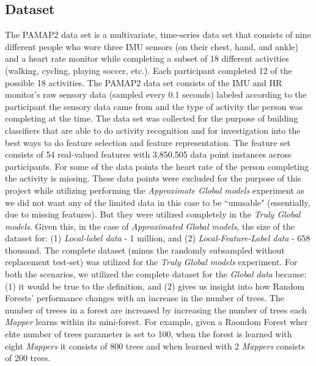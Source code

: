 \documentclass{sig-alternate-05-2015}
\begin{document}
\subsection{Dataset}
The PAMAP2 data set is a multivariate, time-series data set that consists of nine different people who wore three IMU sensors (on their chest, hand, and ankle) and a heart rate monitor while completing a subset of 18 different activities (walking, cycling, playing soccer, etc.). Each participant completed 12 of the possible 18 activities. The PAMAP2 data set consists of the IMU and HR monitor's raw sensory data (sampled every 0.1 seconds) labeled according to the participant the sensory data came from and the type of activity the person was completing at the time. The data set was collected for the purpose of building classifiers that are able to do activity recognition and for investigation into the best ways to do feature selection and feature representation. The feature set consists of 54 real-valued features with 3,850,505 data point instances across participants. For some of the data points the heart rate of the person completing the activity is missing. These data points were excluded for the purpose of this project while utilizing performing the \textit{Approximate Global models} experiment as we did not want any of the limited data in this case to be ``unusable" (essentially, due to missing features). But they were utilized completely in the \textit{Truly Global models}. Given this, in the case of \textit{Approximated Global models}, the size of the dataset for: (1) \textit{Local-label data} - 1 million, and (2) \textit{Local-Feature-Label data} - 658 thousand. The complete dataset (minus the randomly subsampled without replacement test-set) was utilized for the \textit{Truly Global models} experiment. For both the scenarios, we utilized the complete dataset for the \textit{Global data} because: (1) it would be true to the definition, and (2) gives us insight into how Random Forests' performance changes with an increase in the number of trees. The number of treees in a forest are increased by increasing the number of trees each \textit{Mapper} learns within its mini-forest. For example, given a Raondom Forest wher ehte number of trees parameter is set to 100, when the forest is learned with eight \textit{Mappers} it consists of 800 trees and when learned with 2 \textit{Mappers} consists of 200 trees. 
\end{document}
